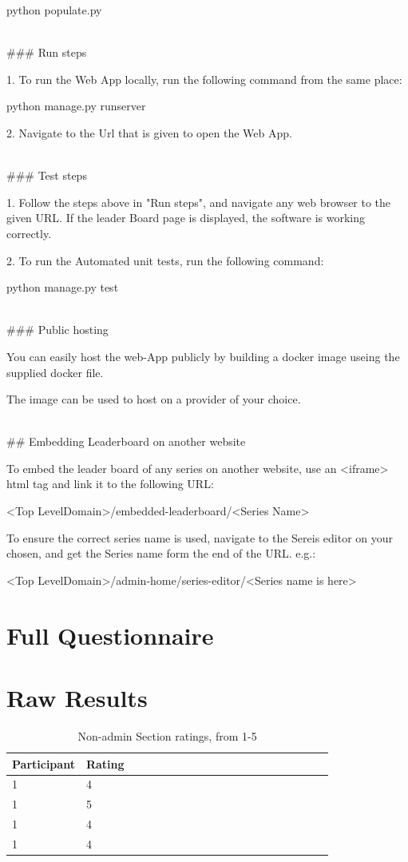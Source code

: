 \documentclass{l4proj}
\begin{document}
\begin{appendices}
	python populate.py

\hfill\\
\#\#\# Run steps

1. To run the Web App locally, run the following command from the same place:

	python manage.py runserver

2. Navigate to the Url that is given to open the Web App.

\hfill\\
\#\#\# Test steps

1. Follow the steps above in "Run steps", and navigate any web browser to the given URL. If the leader Board page is displayed, the software is working correctly.

2. To run the Automated unit tests, run the following command:

 python manage.py test

\hfill\\
\#\#\# Public hosting

You can easily host the web-App publicly by building a docker image useing the supplied docker file.

The image can be used to host on a provider of your choice.

\hfill\\
\#\# Embedding Leaderboard on another website

To embed the leader board of any series on another website, use an <iframe> html tag and link it to the following URL:

	<Top LevelDomain>/embedded-leaderboard/<Series Name>

To ensure the correct series name is used, navigate to the Sereis editor on your chosen, and get the Series name form the end of the URL. e.g.:


	<Top LevelDomain>/admin-home/series-editor/<Series name is here>



\section{Full Questionnaire} \label{apend:questions}


\section{Raw Results}

\begin{table}[!ht]
    \centering
    \caption{Non-admin Section ratings, from 1-5}
    \begin{tabular}{|l|p{0.8\linewidth}|}
    \hline
        \textbf{Participant} & \textbf{Rating}  \\ \hline
        1 & 4  \\ \hline
        1 & 5  \\ \hline
        1 & 4  \\ \hline
        1 & 4  \\ \hline
    \end{tabular}
\end{table}


\end{appendices}
\end{document}
